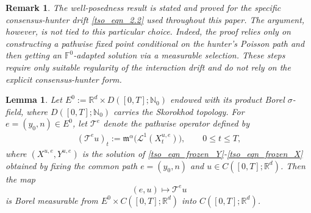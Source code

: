 \documentclass{article}
\def\m{\mathfrak{m}}
\newtheorem{lemma}[theorem]{Lemma}
\newtheorem{remark}{Remark}[section]
\numberwithin{equation}{section}
\begin{document}
\begin{remark}
The well-posedness result is stated and proved for the specific consensus-hunter drift \eqref{tso_eqn_2.2} used throughout this paper. The argument, however, is not tied to this particular choice. Indeed, the proof relies only on constructing a pathwise fixed point conditional on the hunter's Poisson path and then getting an $\mathbb F^0$-adapted solution via a measurable selection. These steps require only suitable regularity of the
interaction drift and do not rely on the explicit consensus-hunter form.
\end{remark}



\begin{lemma}
\label{tso_borel_measurability_lemma}
Let $ E^0:=\mathbb R^d\times D([0,T];\mathbb N_0)$ endowed with its product Borel $\sigma$-field, where
$D([0,T];\mathbb{N}_0)$ carries the Skorokhod topology. For $e=(y_0,n)\in E^0$, let $\mathcal{T}^e$ denote the pathwise operator defined by
\begin{align*}
    (\mathcal{T}^e u)_t :=  \m^\alpha\bigl(\mathcal{L}^1(X_t^{u,e})\bigr),\qquad 0\le t\le T,
\end{align*}
where $(X^{u,e},Y^{u,e})$ is the solution of \eqref{tso_eqn_frozen_Y}-\eqref{tso_eqn_frozen_X} obtained by
fixing the common path $e=(y_0,n)$ and 
$u\in C([0,T];\mathbb R^d)$. Then the map
\begin{equation*}
    (e,u)\longmapsto \mathcal T^e u
\end{equation*}
is Borel measurable from $E^0\times C([0,T];\mathbb R^d)$  into $C([0,T];\mathbb R^d)$. 
\end{lemma}
\end{document}
